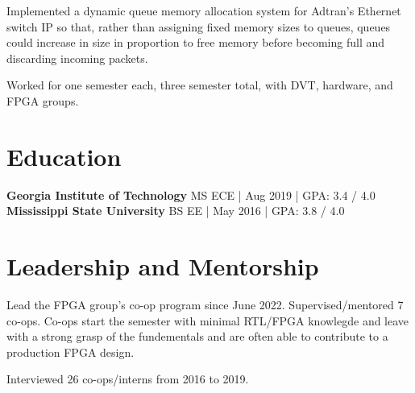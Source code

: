 \documentclass[10pt]{deedy-resume-reversed}
\begin{document}
\begin{minipage}[t]{1.0\textwidth}
\begin{tightemize}
\item Implemented a dynamic queue memory allocation system for Adtran’s Ethernet switch IP so that, rather than assigning fixed memory sizes to queues, 
queues could increase in size in proportion to free memory before becoming full and discarding incoming packets. 
\end{tightemize}
\sectionsep

\begin{tightemize}
\item Worked for one semester each, three semester total, with DVT, hardware, and FPGA groups.
\end{tightemize}
\sectionsep



\section{Education}
\textbf{Georgia Institute of Technology} MS ECE | Aug 2019 | GPA: 3.4 / 4.0 \\ 
\textbf{Mississippi State University} BS EE | May 2016 | GPA: 3.8 / 4.0 \\
\sectionsep


\section{Leadership and Mentorship}
\vspace{\topsep} %
\begin{tightemize}
\item Lead the FPGA group's co-op program since June 2022. Supervised/mentored 7 co-ops.
Co-ops start the semester with minimal RTL/FPGA knowlegde and leave with a strong grasp of 
the fundementals and are often able to contribute to a production FPGA design. 
\item Interviewed 26 co-ops/interns from 2016 to 2019.
\end{tightemize}
\sectionsep


\end{minipage}
\end{document}
